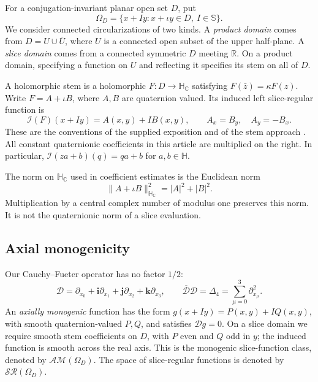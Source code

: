 \documentclass[11pt,a4paper]{article}
\numberwithin{equation}{section}
\theoremstyle{definition}
\theoremstyle{remark}
\newcommand{\R}{\mathbb R}
\newcommand{\C}{\mathbb C}
\newcommand{\HH}{\mathbb H}
\newcommand{\HC}{\mathbb H_{\C}}
\newcommand{\SSS}{\mathbb S}
\newcommand{\SR}{\mathcal{SR}}
\newcommand{\AM}{\mathcal{AM}}
\newcommand{\cI}{\mathcal I}
\newcommand{\cD}{\mathcal D}
\newcommand{\lap}{\Delta_4}
\newcommand{\ii}{\mathbf i}
\newcommand{\jj}{\mathbf j}
\newcommand{\kk}{\mathbf k}
\newcommand{\norm}[1]{\lVert #1\rVert}
\begin{document}
For a conjugation-invariant planar open set $D$, put
\[
 \Omega_D=\{x+Iy:x+\iota y\in D,\ I\in\SSS\}.
\]
We consider connected circularizations of two kinds. A \emph{product domain}
comes from $D=U\cup\bar U$, where $U$ is a connected open subset of the upper
half-plane. A \emph{slice domain} comes from a connected symmetric $D$ meeting
$\R$. On a product domain, specifying a function on $U$ and reflecting it
specifies its stem on all of $D$.

A holomorphic stem is a holomorphic $F:D\to\HC$ satisfying
$F(\bar z)=\kappa F(z)$. Write $F=A+\iota B$, where $A,B$ are quaternion
valued. Its induced left slice-regular function is
\begin{equation}\label{eq:stem}
 \cI(F)(x+Iy)=A(x,y)+IB(x,y),\qquad
 A_x=B_y,\quad A_y=-B_x.
\end{equation}
These are the conventions of the supplied exposition and of the stem approach
\cite{GP}. All constant quaternionic coefficients in this article are multiplied
on the right. In particular, $\cI(z a+b)(q)=qa+b$ for $a,b\in\HH$.

The norm on $\HC$ used in coefficient estimates is the Euclidean norm
\[
 \norm{A+\iota B}_{\HC}^2=|A|^2+|B|^2.
\]
Multiplication by a central complex number of modulus one preserves this norm.
It is not the quaternionic norm of a slice evaluation.

\subsection{Axial monogenicity}
Our Cauchy--Fueter operator has no factor $1/2$:
\begin{equation}\label{eq:Dirac}
 \cD=\partial_{x_0}+\ii\partial_{x_1}
       +\jj\partial_{x_2}+\kk\partial_{x_3},\qquad
 \overline{\cD}\cD=\lap=\sum_{\mu=0}^3\partial_{x_\mu}^2.
\end{equation}
An \emph{axially monogenic} function has the form
$g(x+Iy)=P(x,y)+IQ(x,y)$, with smooth quaternion-valued $P,Q$, and satisfies
$\cD g=0$. On a slice domain we require smooth stem coefficients on $D$, with
$P$ even and $Q$ odd in $y$; the induced function is smooth across the real
axis. This is the monogenic slice-function class, denoted by $\AM(\Omega_D)$.
The space of slice-regular functions is denoted by $\SR(\Omega_D)$.
\end{document}
